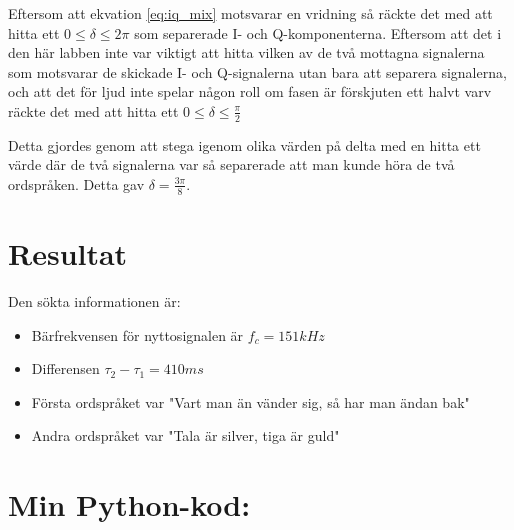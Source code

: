 \documentclass[10pt,twocolumn]{article}
\begin{document}
Eftersom att ekvation \ref{eq:iq_mix} motsvarar en vridning så räckte det med att hitta ett 
$0 \leq \delta \leq 2\pi$ som separerade I- och Q-komponenterna.
Eftersom att det i den här labben inte var viktigt att hitta vilken av de två mottagna signalerna som
motsvarar de skickade I- och Q-signalerna utan bara att separera signalerna, och att det för ljud inte spelar
någon roll om fasen är förskjuten ett halvt varv räckte det med att hitta ett 
$0 \leq \delta \leq \frac{\pi}{2}$

Detta gjordes genom att stega igenom olika värden på delta med en hitta ett värde
där de två signalerna var så separerade att man kunde höra de två ordspråken. Detta gav 
$\delta=\frac{3\pi}{8}$.


\section{Resultat}

Den sökta informationen är:
\begin{itemize}
\item Bärfrekvensen för nyttosignalen är $f_c=151kHz$
\item Differensen $\tau_2-\tau_1=410ms$
\item Första ordspråket var "Vart man än vänder sig, så har man ändan bak"
\item Andra ordspråket var "Tala är silver, tiga är guld"
\end{itemize}

\clearpage

\onecolumn
\section*{Min Python-kod:}

\end{document}
